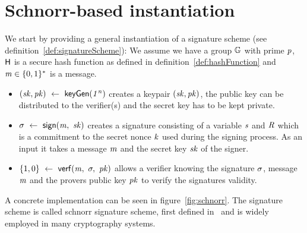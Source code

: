 \section{Schnorr-based instantiation}\label{sec:schnorrInst}

We start by providing a general instantiation of a signature scheme (see definition~\ref{def:signatureScheme}):
We assume we have a group $\mathbb{G}$ with prime $\mathit{p}$, $\mathsf{H}$ is a secure hash function as defined in definition~\ref{def:hashFunction} and $\mathit{m} \in \{0,1\}^{*}$ is a message.

\begin{itemize}
    \item $(\mathit{sk}, \mathit{pk}) ~\leftarrow~ \mathsf{keyGen}(\mathit{1^n})$ creates a keypair $(\mathit{sk}, \mathit{pk})$, the public key can be distributed to the verifier(s) and the secret key has to be kept private. \\
    \item $\sigma ~\leftarrow~ \mathsf{sign}(\mathit{m} ,~ \mathit{sk})$ creates a signature consisting of a variable $\mathit{s}$ and $\mathit{R}$ which is a commitment to the secret nonce $\mathit{k}$ used during the signing process.
    As an input it takes a message $\mathit{m}$ and the secret key $\mathit{sk}$ of the signer.
    \item $\{1,0\} ~\leftarrow~ \mathsf{verf}(\mathit{m} ,~ \sigma ,~ \mathit{pk})$ allows a verifier knowing the signature $\sigma$, message $\mathit{m}$ and the provers public key $\mathit{pk}$ to verify the signatures
    validity. \\
\end{itemize}
A concrete implementation can be seen in figure~\ref{fig:schnorr}. The signature scheme is called schnorr signature scheme, first defined in~\cite{schnorr1989efficient} and is widely employed in many cryptography systems.
